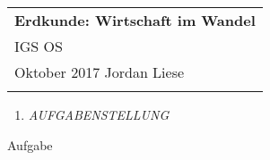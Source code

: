 \documentclass[a4paper,12pt]{article}
\def \dtitle {Erdkunde: Wirtschaft im Wandel}
\begin{document}
\thispagestyle{empty}

\begin{tabular}{p{15.5cm}}
{\large \bf \dtitle} \\
IGS OS\\ Oktober 2017 \hspace*{10.5cm} Jordan Liese\\
\midrule
\\
\end{tabular}

\vspace*{0.3cm}
\vspace{0.4cm}


\begin{enumerate}
\item{\textit{ AUFGABENSTELLUNG }}
\end{enumerate}

Aufgabe
\end{document}
